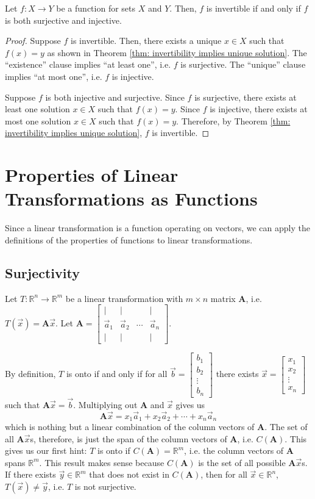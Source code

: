 \documentclass[]{book}
\newcommand{\vecxxdx}[1][x]{\ensuremath{\begin{bmatrix}
#1_1 \\
#1_2 \\
\vdots \\
#1_n
\end{bmatrix}}}
\newcommand{\mat}[1]{\ensuremath{\mathbf{#1}}}
\newcommand{\cmat}[1][v]{\begin{bmatrix}
        \vert & \vert & & \vert \\
        \vec{#1}_1 & \vec{#1}_2 & \cdots & \vec{#1}_n \\
        \vert & \vert & & \vert
    \end{bmatrix}
}
\newcommand{\R}{\ensuremath{\mathbb{R}}}
\begin{document}
\begin{theorem}
    \label{thm: invertibility, surjectivity, injectivity}
    Let $f:X \to Y$ be a function for sets $X$ and $Y$. Then, $f$ is invertible if and only if $f$ is both surjective and injective.
\begin{proof}
    Suppose $f$ is invertible. Then, there exists a unique $x \in X$ such that $f(x)=y$ as shown in Theorem \ref{thm: invertibility implies unique solution}. The ``existence'' clause implies ``at least one'', i.e. $f$ is surjective. The ``unique'' clause implies ``at most one'', i.e. $f$ is injective. 
    
    Suppose $f$ is both injective and surjective. Since $f$ is surjective, there exists at least one solution $x \in X$ such that $f(x)=y$. Since $f$ is injective, there exists at most one solution $x \in X$ such that $f(x)=y$. Therefore, by Theorem \ref{thm: invertibility implies unique solution}, $f$ is invertible.
\end{proof}
\end{theorem}


\section{Properties of Linear Transformations as Functions}
Since a linear transformation is a function operating on vectors, we can apply the definitions of the properties of functions to linear transformations.
\subsection{Surjectivity}
Let $T:\R^n \to \R^m$ be a linear transformation with $m \times n$ matrix $\mat{A}$, i.e. $T(\vec{x}) = \mat{A}\vec{x}$. Let $\mat{A} = \cmat[a]$.

By definition, $T$ is onto if and only if for all $\vec{b} = \vecxxdx[b]$ there exists $\vec{x} = \vecxxdx$ such that $\mat{A}\vec{x} = \vec{b}$. Multiplying out $\mat{A}$ and $\vec{x}$ gives us \[\mat{A} \vec{x} = x_1\vec{a}_1 + x_2\vec{a}_2 + \cdots + x_n\vec{a}_n\]
which is nothing but a linear combination of the column vectors of $\mat{A}$. The set of all $\mat{A}\vec{x}$s, therefore, is just the span of the column vectors of $\mat{A}$, i.e. $C(\mat{A})$. This gives us our first hint: $T$ is onto if $C(\mat{A}) = \R^m$, i.e. the column vectors of $\mat{A}$ spans $\R^m$. This result makes sense because $C(\mat{A})$ is the set of all possible $\mat{A}\vec{x}$s. If there exists $\vec{y} \in \R^m$ that does not exist in $C(\mat{A})$, then for all $\vec{x} \in \R^n$, $T(\vec{x}) \neq \vec{y}$, i.e. $T$ is not surjective. 
\end{document}
